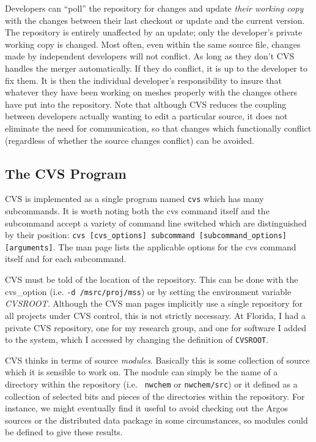 Developers can ``poll'' the repository for changes and update {\em
  their working copy} with the changes between their last checkout or
update and the current version.  The repository is entirely unaffected
by an update; only the developer's private working copy is changed.
Most often, even within the same source file, changes made by
independent developers will not conflict.  As long as they don't CVS
handles the merger automatically.  If they do conflict, it is up to
the developer to fix them.  It is then the individual developer's
responsibility to insure that whatever they have been working on
meshes properly with the changes others have put into the repository.
Note that although CVS reduces the coupling between developers
actually wanting to edit a particular source, it does not eliminate
the need for communication, so that changes which functionally
conflict (regardless of whether the source changes conflict) can be
avoided.

\subsection{The CVS Program}

CVS is implemented as a single program named {\tt cvs} which has many
subcommands.  It is worth noting both the cvs command itself and the
subcommand accept a variety of command line switched which are
distinguished by their position: {\tt cvs [cvs\_options] subcommand
[subcommand\_options] [arguments]}.  The man page lists the
applicable options for the cvs command itself and for each subcommand.

CVS must be told of the location of the repository.  This can be done
with the cvs\_option (i.e. {\tt -d /msrc/proj/mss}) or by setting
the environment variable {\it CVSROOT}.  Although the CVS man pages
implicitly use a single repository for all projects under CVS control,
this is not strictly necessary.  At Florida, I had a private CVS
repository, one for my research group, and one for software I added to
the system, which I accessed by changing the definition of {\tt CVSROOT}.

CVS thinks in terms of source {\em modules}.  Basically this is some
collection of source which it is sensible to work on.  The module can
simply be the name of a directory within the repository (i.e. {\tt
nwchem} or {\tt nwchem/src}) or it defined as a collection of selected
bits and pieces of the directories within the repository.  For
instance, we might eventually find it useful to avoid checking out the
Argos sources or the distributed data package in some circumstances,
so modules could be defined to give these results.

